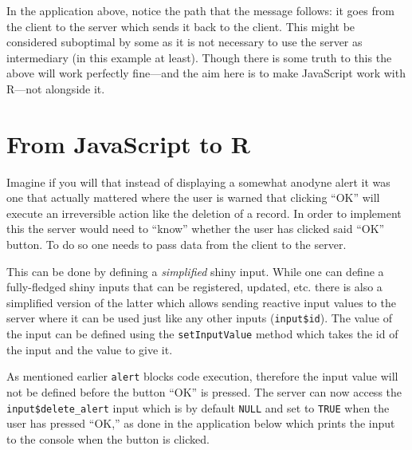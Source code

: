 \documentclass[
]{krantz}
\makeatletter
\newenvironment{Shaded}{\begin{snugshade}}{\end{snugshade}}
\newcommand{\KeywordTok}[1]{\textcolor[rgb]{0.27,0.27,0.27}{\textbf{#1}}}
\newcommand{\NormalTok}[1]{#1}
\newcommand{\OperatorTok}[1]{\textcolor[rgb]{0.43,0.43,0.43}{\textbf{#1}}}
\newcommand{\StringTok}[1]{\textcolor[rgb]{0.5,0.5,0.5}{#1}}
\newenvironment{kframe}{%
\medskip{}
\setlength{\fboxsep}{.8em}
 \def\at@end@of@kframe{}%
 \ifinner\ifhmode%
  \def\at@end@of@kframe{\end{minipage}}%
  \begin{minipage}{\columnwidth}%
 \fi\fi%
 \def\FrameCommand##1{\hskip\@totalleftmargin \hskip-\fboxsep
 \colorbox{shadecolor}{##1}\hskip-\fboxsep
     \hskip-\linewidth \hskip-\@totalleftmargin \hskip\columnwidth}%
 \MakeFramed {\advance\hsize-\width
   \@totalleftmargin\z@ \linewidth\hsize
   \@setminipage}}%
 {\par\unskip\endMakeFramed%
 \at@end@of@kframe}
\renewenvironment{Shaded}{\begin{kframe}}{\end{kframe}}
\makeatother
\begin{document}
In the application above, notice the path that the message follows: it goes from the client to the server which sends it back to the client. This might be considered suboptimal by some as it is not necessary to use the server as intermediary (in this example at least). Though there is some truth to this the above will work perfectly fine---and the aim here is to make JavaScript work with R---not alongside it.

\hypertarget{shiny-intro-js-to-r}{%
\section{From JavaScript to R}\label{shiny-intro-js-to-r}}

Imagine if you will that instead of displaying a somewhat anodyne alert it was one that actually mattered where the user is warned that clicking ``OK'' will execute an irreversible action like the deletion of a record. In order to implement this the server would need to ``know'' whether the user has clicked said ``OK'' button. To do so one needs to pass data from the client to the server.

This can be done by defining a \emph{simplified} shiny input. While one can define a fully-fledged shiny inputs that can be registered, updated, etc. there is also a simplified version of the latter which allows sending reactive input values to the server where it can be used just like any other inputs (\texttt{input\$id}). The value of the input can be defined using the \texttt{setInputValue} method which takes the id of the input and the value to give it.

\begin{Shaded}
\end{Shaded}

As mentioned earlier \texttt{alert} blocks code execution, therefore the input value will not be defined before the button ``OK'' is pressed. The server can now access the \texttt{input\$delete\_alert} input which is by default \texttt{NULL} and set to \texttt{TRUE} when the user has pressed ``OK,'' as done in the application below which prints the input to the console when the button is clicked.
\end{document}
